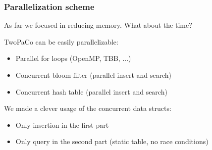 
\begin{frame}
	\frametitle{Parallelization scheme}
	\centering
	
	As far we focused in reducing memory. What about the time?
	
	\pause
	
	\bigskip
	
	TwoPaCo can be easily parallelizable:
	
	\begin{itemize}
	  \item Parallel for loops (OpenMP, TBB, ...)
	  \item Concurrent bloom filter (parallel insert and search)
	  \item Concurrent hash table (parallel insert and search)
	\end{itemize}
	
	\pause
	
	\medskip
	
	We made a clever usage of the concurrent data structs:
	
	\begin{itemize}
	  \item Only insertion in the first part
	  \item Only query in the second part (static table, no race conditions)
	\end{itemize}
	
	
	
\end{frame}
